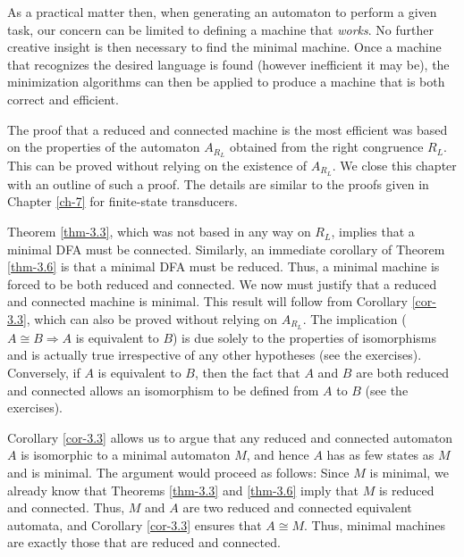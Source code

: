 As a practical matter then, when generating an automaton to perform a given
task, our concern can be limited to defining a machine that \emph{works}. No further
creative insight is then necessary to find the minimal machine. Once a machine
that recognizes the desired language is found (however inefficient it may be),
the minimization algorithms can then be applied to produce a machine that is
both correct and efficient.

The proof that a reduced and connected machine is the most efficient was based
on the properties of the automaton $A_{R_L}$ obtained from the right congruence
$R_L$. This can be proved without relying on the existence of $A_{R_L}$. We
close this chapter with an outline of such a proof. The details are similar to
the proofs given in Chapter \ref{ch-7} for finite-state transducers.

Theorem \ref{thm-3.3}, which was not based in any way on $R_L$, implies that a minimal
DFA must be connected. Similarly, an immediate corollary of Theorem \ref{thm-3.6} is
that a minimal DFA must be reduced. Thus, a minimal machine is forced to be both
reduced and connected. We now must justify that a reduced and connected machine
is minimal. This result will follow from Corollary \ref{cor-3.3}, which can also be proved
without relying on $A_{R_L}$. The implication ($A \cong B \Rightarrow A$ is
equivalent to $B$) is due solely to the properties of isomorphisms and is
actually true irrespective of any other hypotheses (see the exercises).
Conversely, if $A$ is equivalent to $B$, then the fact that $A$ and $B$ are both
reduced and connected allows an isomorphism to be defined from $A$ to $B$ (see
the exercises).

Corollary \ref{cor-3.3} allows us to argue that any reduced and connected automaton $A$
is isomorphic to a minimal automaton $M$, and hence $A$ has as few states as $M$
and is minimal. The argument would proceed as follows: Since $M$ is minimal, we
already know that Theorems \ref{thm-3.3} and \ref{thm-3.6} imply that $M$ is reduced and connected.
Thus, $M$ and $A$ are two reduced and connected equivalent automata, and
Corollary \ref{cor-3.3} ensures that $A \cong M$. Thus, minimal machines are exactly those
that are reduced and connected.

